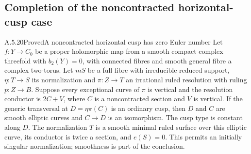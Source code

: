\subsection{Completion of the noncontracted horizontal-cusp case}

\begin{statement}{A.5.20}{Proved}{A noncontracted horizontal cusp has zero Euler number}
Let $f:Y\to C_0$ be a proper holomorphic map from a smooth
compact complex threefold with $b_2(Y)=0$, with connected
fibres and smooth general fibre a complex two-torus.
Let $mS$ be a full fibre with irreducible reduced support,
$\eta:T\to S$ its normalization and $\pi:Z\to T$ an
irrational ruled resolution with ruling $p:Z\to B$.
Suppose every exceptional curve of $\pi$ is vertical
and the resolution conductor is $2C+V$, where $C$
is a noncontracted section and $V$ is vertical.
If the generic transversal at $D=\eta\pi(C)$ is an
ordinary cusp, then $D$ and $C$ are smooth elliptic
curves and $C\to D$ is an isomorphism. The cusp type
is constant along $D$. The normalization $T$ is a
smooth minimal ruled surface over this elliptic curve,
its conductor is twice a section, and $e(S)=0$.
This permits an initially singular normalization;
smoothness is part of the conclusion.
\end{statement}

